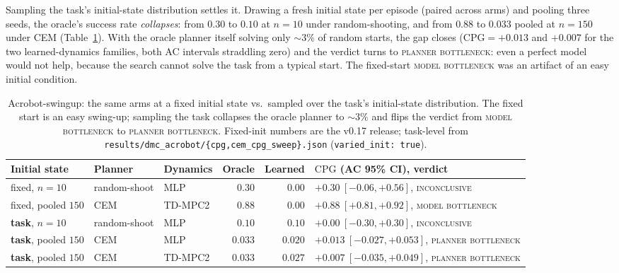 \documentclass[10pt,letterpaper]{article}
\begin{document}


Sampling the task's initial-state distribution settles it. Drawing a fresh initial state per episode (paired across arms) and pooling three seeds, the oracle's success rate \emph{collapses}: from $0.30$ to $0.10$ at $n = 10$ under random-shooting, and from $0.88$ to $0.033$ pooled at $n = 150$ under CEM (Table~\ref{tab:selfcorrection}). With the oracle planner itself solving only $\sim\!3\%$ of random starts, the gap closes ($\mathrm{CPG} = +0.013$ and $+0.007$ for the two learned-dynamics families, both AC intervals straddling zero) and the verdict turns to \textsc{planner bottleneck}: even a perfect model would not help, because the search cannot solve the task from a typical start. The fixed-start \textsc{model bottleneck} was an artifact of an easy initial condition.

\begin{table}[t]
  \centering
  \small
  \begin{tabular}{lllrrl}
    \toprule
    Initial state & Planner & Dynamics & Oracle & Learned & $\mathrm{CPG}$ (AC 95\% CI), verdict \\
    \midrule
    fixed, $n{=}10$        & random-shoot & MLP     & $0.30$  & $0.00$  & $+0.30\ [-0.06, +0.56]$, \textsc{inconclusive} \\
    fixed, pooled $150$    & CEM          & TD-MPC2 & $0.88$  & $0.00$  & $+0.88\ [+0.81, +0.92]$, \textsc{model bottleneck} \\
    \midrule
    \textbf{task}, $n{=}10$     & random-shoot & MLP     & $0.10$  & $0.10$  & $+0.00\ [-0.30, +0.30]$, \textsc{inconclusive} \\
    \textbf{task}, pooled $150$ & CEM          & MLP     & $0.033$ & $0.020$ & $+0.013\ [-0.027, +0.053]$, \textsc{planner bottleneck} \\
    \textbf{task}, pooled $150$ & CEM          & TD-MPC2 & $0.033$ & $0.027$ & $+0.007\ [-0.035, +0.049]$, \textsc{planner bottleneck} \\
    \bottomrule
  \end{tabular}
  \caption{Acrobot-swingup: the same arms at a fixed initial state vs.\ sampled over the task's initial-state distribution. The fixed start is an easy swing-up; sampling the task collapses the oracle planner to $\sim\!3\%$ and flips the verdict from \textsc{model bottleneck} to \textsc{planner bottleneck}. Fixed-init numbers are the v0.17 release; task-level from \texttt{results/dmc\_acrobot/\{cpg,cem\_cpg\_sweep\}.json} (\texttt{varied\_init: true}).}
  \label{tab:selfcorrection}
\end{table}
\end{document}
